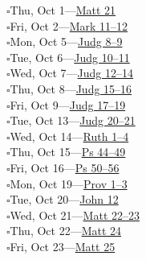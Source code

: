 \hypertarget{rp-2026-10-01}{}\noindent$\square$\enspace Thu, Oct 1\enspace---\enspace \hyperlink{ch-matthew-21}{Matt 21}\\
\hypertarget{rp-2026-10-02}{}\noindent$\square$\enspace Fri, Oct 2\enspace---\enspace \hyperlink{ch-mark-11}{Mark 11--12}\\
\hypertarget{rp-2026-10-05}{}\noindent$\square$\enspace Mon, Oct 5\enspace---\enspace \hyperlink{ch-judges-8}{Judg 8--9}\\
\hypertarget{rp-2026-10-06}{}\noindent$\square$\enspace Tue, Oct 6\enspace---\enspace \hyperlink{ch-judges-10}{Judg 10--11}\\
\hypertarget{rp-2026-10-07}{}\noindent$\square$\enspace Wed, Oct 7\enspace---\enspace \hyperlink{ch-judges-12}{Judg 12--14}\\
\hypertarget{rp-2026-10-08}{}\noindent$\square$\enspace Thu, Oct 8\enspace---\enspace \hyperlink{ch-judges-15}{Judg 15--16}\\
\hypertarget{rp-2026-10-09}{}\noindent$\square$\enspace Fri, Oct 9\enspace---\enspace \hyperlink{ch-judges-17}{Judg 17--19}\\
\hypertarget{rp-2026-10-13}{}\noindent$\square$\enspace Tue, Oct 13\enspace---\enspace \hyperlink{ch-judges-20}{Judg 20--21}\\
\hypertarget{rp-2026-10-14}{}\noindent$\square$\enspace Wed, Oct 14\enspace---\enspace \hyperlink{ch-ruth-1}{Ruth 1--4}\\
\hypertarget{rp-2026-10-15}{}\noindent$\square$\enspace Thu, Oct 15\enspace---\enspace \hyperlink{ch-psalms-44}{Ps 44--49}\\
\hypertarget{rp-2026-10-16}{}\noindent$\square$\enspace Fri, Oct 16\enspace---\enspace \hyperlink{ch-psalms-50}{Ps 50--56}\\
\hypertarget{rp-2026-10-19}{}\noindent$\square$\enspace Mon, Oct 19\enspace---\enspace \hyperlink{ch-proverbs-1}{Prov 1--3}\\
\hypertarget{rp-2026-10-20}{}\noindent$\square$\enspace Tue, Oct 20\enspace---\enspace \hyperlink{ch-john-12}{John 12}\\
\hypertarget{rp-2026-10-21}{}\noindent$\square$\enspace Wed, Oct 21\enspace---\enspace \hyperlink{ch-matthew-22}{Matt 22--23}\\
\hypertarget{rp-2026-10-22}{}\noindent$\square$\enspace Thu, Oct 22\enspace---\enspace \hyperlink{ch-matthew-24}{Matt 24}\\
\hypertarget{rp-2026-10-23}{}\noindent$\square$\enspace Fri, Oct 23\enspace---\enspace \hyperlink{ch-matthew-25}{Matt 25}\\
